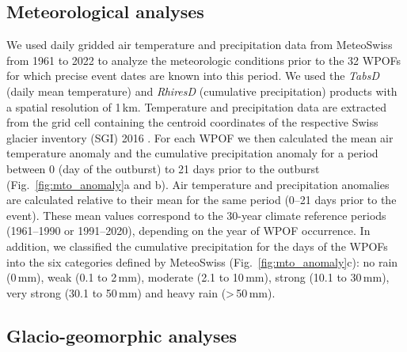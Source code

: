 \subsection{ Meteorological analyses}
\label{method_meteo}

We used daily gridded air temperature and precipitation data from MeteoSwiss from 1961 to 2022 \citep{MeteoSwiss2022} to analyze the meteorologic conditions prior to the 32 WPOFs for which precise event dates are known into this period. We used the \textit{TabsD} (daily mean temperature) and \textit{RhiresD} (cumulative precipitation) products with a spatial resolution of 1\,km. Temperature and precipitation data are extracted from the grid cell containing the centroid coordinates of the respective Swiss glacier inventory (SGI) 2016 \citep{Linsbauer&al2021}. For each WPOF we then calculated the mean air temperature anomaly and the cumulative precipitation anomaly for a period between 0 (day of the outburst) to 21 days prior to the outburst (Fig.~\ref{fig:mto_anomaly}a and b). Air temperature and precipitation anomalies are calculated relative to their mean for the same period (0–21 days prior to the event). These mean values correspond to the 30-year climate reference periods (1961–1990 or 1991–2020), depending on the year of WPOF occurrence. In addition, we classified the cumulative precipitation for the days of the WPOFs into the six categories defined by MeteoSwiss (Fig.~\ref{fig:mto_anomaly}c): no rain (0\,mm), weak (0.1 to 2\,mm), moderate (2.1 to 10\,mm), strong (10.1 to 30\,mm), very strong (30.1 to 50\,mm) and heavy rain (>\,50\,mm).


\subsection{ Glacio-geomorphic analyses}
\label{method_geo}

